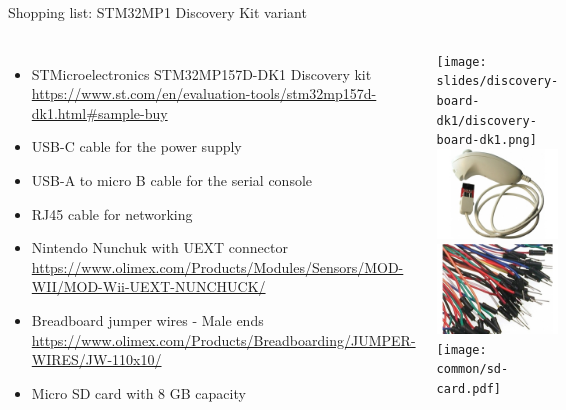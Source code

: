 \begin{frame}[fragile]{Shopping list: STM32MP1 Discovery Kit variant}
  \begin{columns}
    \begin{itemize}
    \item STMicroelectronics STM32MP157D-DK1 Discovery kit
      {\fontsize{6}{6}\selectfont
        \url{https://www.st.com/en/evaluation-tools/stm32mp157d-dk1.html#sample-buy}
      }
    \item USB-C cable for the power supply
    \item USB-A to micro B cable for the serial console
    \item RJ45 cable for networking
    \item Nintendo Nunchuk with UEXT connector
      {\fontsize{6}{6}\selectfont
        \url{https://www.olimex.com/Products/Modules/Sensors/MOD-WII/MOD-Wii-UEXT-NUNCHUCK/}
      }
    \item Breadboard jumper wires - Male ends
      {\fontsize{6}{6}\selectfont
        \url{https://www.olimex.com/Products/Breadboarding/JUMPER-WIRES/JW-110x10/}
      }
    \item Micro SD card with 8 GB capacity
    \end{itemize}
    \begin{center}
      \texttt{[image: slides/discovery-board-dk1/discovery-board-dk1.png]}\\
      \includegraphics[height=0.2\textheight]{common/nunchuk.jpg} \\
      \includegraphics[height=0.15\textheight]{common/jumper-wires.jpg} \\
      \texttt{[image: common/sd-card.pdf]}
    \end{center}
  \end{columns}
\end{frame}
